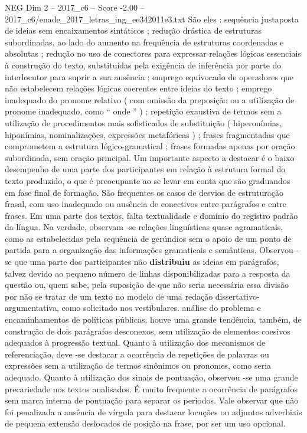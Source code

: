 \begin{textsample}{NEG Dim 2 – 2017\_c6 – Score -2.00 – 2017\_c6/enade\_2017\_letras\_ing\_ee342011e3.txt}
São eles : sequência justaposta de ideias sem encaixamentos sintáticos ; redução drástica de estruturas subordinadas, ao lado do aumento na frequência de estruturas coordenadas e absolutas ; redução no uso de conectores para expressar relações lógicas essenciais à construção do texto, substituídas pela exigência de inferência por parte do interlocutor para suprir a sua ausência ; emprego equivocado de operadores que não estabelecem relações lógicas coerentes entre ideias do texto ; emprego inadequado do pronome relativo ( com omissão da preposição ou a utilização de pronome inadequado, como “ onde ” ) ; repetição exaustiva de termos sem a utilização de procedimentos mais sofisticados de substituição ( hiperonímias, hiponímias, nominalizações, expressões metafóricas ) ; frases fragmentadas que comprometem a estrutura lógico-gramatical ; frases formadas apenas por oração subordinada, sem oração principal.
Um importante aspecto a destacar é o baixo desempenho de uma parte dos participantes em relação à estrutura formal do texto produzido, o que é preocupante ao se levar em conta que são graduandos em fase final de formação.
São frequentes os casos de desvios de estruturação frasal, com uso inadequado ou ausência de conectivos entre parágrafos e entre frases.
Em uma parte dos textos, falta textualidade e domínio do registro padrão da língua.
Na verdade, observam -se relações linguísticas quase agramaticais, como as estabelecidas pela sequência de gerúndios sem o apoio de um ponto de partida para a organização das informações gramaticais e semânticas.
Observou -se que uma parte dos participantes não \textbf{distribuiu} as ideias em parágrafos, talvez devido ao pequeno número de linhas disponibilizadas para a resposta da questão ou, quem sabe, pela suposição de que não seria necessária essa divisão por não se tratar de um texto no modelo de uma redação dissertativo-argumentativa, como solicitado nos vestibulares. análise do problema e encaminhamentos de políticas públicas, houve uma grande tendência, também, de construção de dois parágrafos desconexos, sem utilização de elementos coesivos adequados à progressão textual.
Quanto à utilização dos mecanismos de referenciação, deve -se destacar a ocorrência de repetições de palavras ou expressões sem a utilização de termos sinônimos ou pronomes, como seria adequado.
Quanto à utilização dos sinais de pontuação, observou -se uma grande precariedade nos textos analisados.
É muito frequente a ocorrência de parágrafos sem marca interna de pontuação para separar os períodos.
Vale observar que não foi penalizada a ausência de vírgula para destacar locuções ou adjuntos adverbiais de pequena extensão deslocados de posição na frase, por ser um uso opcional.

\end{textsample}
